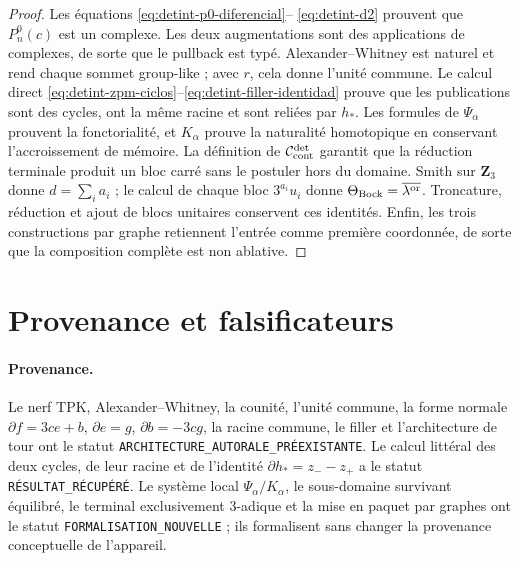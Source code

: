 \begin{proof}
Les équations \eqref{eq:detint-p0-diferencial}--
\eqref{eq:detint-d2} prouvent que \(P_n^0(c)\) est un complexe. Les deux
augmentations sont des applications de complexes, de sorte que le pullback est typé.
Alexander--Whitney est naturel et rend chaque sommet group-like ; avec
\(r\), cela donne l'unité commune. Le calcul direct
\eqref{eq:detint-zpm-ciclos}--\eqref{eq:detint-filler-identidad} prouve que
les publications sont des cycles, ont la même racine et sont reliées par
\(h_*\). Les formules de \(\Psi_\alpha\) prouvent la fonctorialité, et
\(K_\alpha\) prouve la naturalité homotopique en conservant l'accroissement de
mémoire. La définition de \(\mathcal C_{\rm cont}^{\rm det}\) garantit que
la réduction terminale produit un bloc carré sans le postuler hors du
domaine. Smith sur \(\mathbf Z_3\) donne \(d=\sum_i a_i\) ; le calcul de chaque
bloc \(3^{a_i}u_i\) donne
\(\Theta_{\rm Bock}=\overline{\lambda^{\rm or}}\). Troncature, réduction et
ajout de blocs unitaires conservent ces identités. Enfin, les
trois constructions par graphe retiennent l'entrée comme première coordonnée,
de sorte que la composition complète est non ablative.
\end{proof}

\section{Provenance et falsificateurs}

\paragraph{Provenance.}
Le nerf TPK, Alexander--Whitney, la counité, l'unité commune, la forme
normale \(\partial f=3ce+b\), \(\partial e=g\),
\(\partial b=-3cg\), la racine commune, le filler et l'architecture de tour
ont le statut \texttt{ARCHITECTURE\_AUTORALE\_PRÉEXISTANTE}. Le calcul
littéral des deux cycles, de leur racine et de l'identité
\(\partial h_*=z_--z_+\) a le statut \texttt{RÉSULTAT\_RÉCUPÉRÉ}. Le
système local \(\Psi_\alpha/K_\alpha\), le sous-domaine survivant
équilibré, le terminal exclusivement \(3\)-adique et la mise en paquet par
graphes ont le statut \texttt{FORMALISATION\_NOUVELLE} ; ils formalisent sans changer
la provenance conceptuelle de l'appareil.

